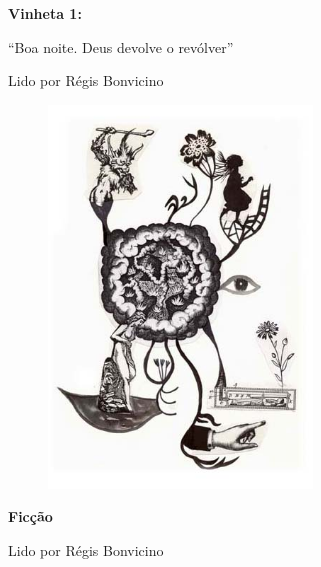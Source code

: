 \pagebreak
\begin{absolutelynopagebreak}
\textbf{Vinheta 1:}

``Boa noite. Deus devolve o revólver''

Lido por Régis Bonvicino



\begin{vplace}
\begin{figure}[H]
  \centering
  \vspace*{5cm}
  \includegraphics[width=70mm]{./imgs/caparc1.jpg}  

\end{figure}
\end{vplace}

\end{absolutelynopagebreak}

\pagebreak

\textbf{Ficção}

Lido por Régis Bonvicino

